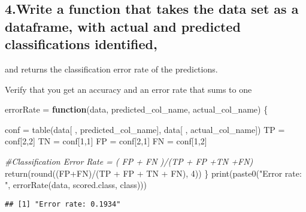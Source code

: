 \documentclass[
]{article}
\newenvironment{Shaded}{\begin{snugshade}}{\end{snugshade}}
\newcommand{\CommentTok}[1]{\textcolor[rgb]{0.56,0.35,0.01}{\textit{#1}}}
\newcommand{\ControlFlowTok}[1]{\textcolor[rgb]{0.13,0.29,0.53}{\textbf{#1}}}
\newcommand{\DecValTok}[1]{\textcolor[rgb]{0.00,0.00,0.81}{#1}}
\newcommand{\FunctionTok}[1]{\textcolor[rgb]{0.00,0.00,0.00}{#1}}
\newcommand{\NormalTok}[1]{#1}
\newcommand{\OtherTok}[1]{\textcolor[rgb]{0.56,0.35,0.01}{#1}}
\newcommand{\SpecialCharTok}[1]{\textcolor[rgb]{0.00,0.00,0.00}{#1}}
\newcommand{\StringTok}[1]{\textcolor[rgb]{0.31,0.60,0.02}{#1}}
\begin{document}
\hypertarget{write-a-function-that-takes-the-data-set-as-a-dataframe-with-actual-and-predicted-classifications-identified-1}{%
\subsection{4.Write a function that takes the data set as a dataframe,
with actual and predicted classifications
identified,}\label{write-a-function-that-takes-the-data-set-as-a-dataframe-with-actual-and-predicted-classifications-identified-1}}

and returns the classification error rate of the predictions.

Verify that you get an accuracy and an error rate that sums to one

\begin{Shaded}
\begin{Highlighting}[]
\NormalTok{errorRate }\OtherTok{=} \ControlFlowTok{function}\NormalTok{(data, predicted\_col\_name, actual\_col\_name) \{}
  
\NormalTok{  conf }\OtherTok{=} \FunctionTok{table}\NormalTok{(data[ , predicted\_col\_name], data[ , actual\_col\_name])}
\NormalTok{  TP }\OtherTok{=}\NormalTok{ conf[}\DecValTok{2}\NormalTok{,}\DecValTok{2}\NormalTok{]}
\NormalTok{  TN }\OtherTok{=}\NormalTok{ conf[}\DecValTok{1}\NormalTok{,}\DecValTok{1}\NormalTok{]}
\NormalTok{  FP }\OtherTok{=}\NormalTok{ conf[}\DecValTok{2}\NormalTok{,}\DecValTok{1}\NormalTok{]}
\NormalTok{  FN }\OtherTok{=}\NormalTok{ conf[}\DecValTok{1}\NormalTok{,}\DecValTok{2}\NormalTok{]}
  
  \CommentTok{\#Classification Error Rate = ( FP + FN )/(TP + FP +TN +FN)}
  \FunctionTok{return}\NormalTok{(}\FunctionTok{round}\NormalTok{((FP}\SpecialCharTok{+}\NormalTok{FN)}\SpecialCharTok{/}\NormalTok{(TP }\SpecialCharTok{+}\NormalTok{ FP }\SpecialCharTok{+}\NormalTok{ TN }\SpecialCharTok{+}\NormalTok{ FN), }\DecValTok{4}\NormalTok{))}
\NormalTok{\}}
\FunctionTok{print}\NormalTok{(}\FunctionTok{paste0}\NormalTok{(}\StringTok{"Error rate: "}\NormalTok{, }\FunctionTok{errorRate}\NormalTok{(data, }\StringTok{\textquotesingle{}scored.class\textquotesingle{}}\NormalTok{, }\StringTok{\textquotesingle{}class\textquotesingle{}}\NormalTok{)))}
\end{Highlighting}
\end{Shaded}

\begin{verbatim}
## [1] "Error rate: 0.1934"
\end{verbatim}
\end{document}
